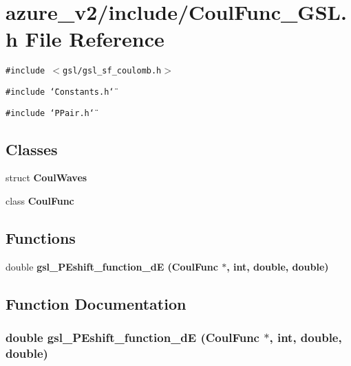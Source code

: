 \section{azure\_\-v2/include/Coul\-Func\_\-GSL.h File Reference}
\label{CoulFunc__GSL_8h}
{\tt \#include $<$gsl/gsl\_\-sf\_\-coulomb.h$>$}\par
{\tt \#include \char`\"{}Constants.h\char`\"{}}\par
{\tt \#include \char`\"{}PPair.h\char`\"{}}\par
\subsection*{Classes}
\begin{CompactItemize}
\item 
struct \bf{Coul\-Waves}
\item 
class \bf{Coul\-Func}
\end{CompactItemize}
\subsection*{Functions}
\begin{CompactItemize}
\item 
double \bf{gsl\_\-PEshift\_\-function\_\-d\-E} (\bf{Coul\-Func} $\ast$, int, double, double)
\end{CompactItemize}


\subsection{Function Documentation}
\subsubsection{\setlength{\rightskip}{0pt plus 5cm}double gsl\_\-PEshift\_\-function\_\-d\-E (\bf{Coul\-Func} $\ast$, int, double, double)}\label{CoulFunc__GSL_8h_1857cfc246c40cf3775d6bc5190e9621}


